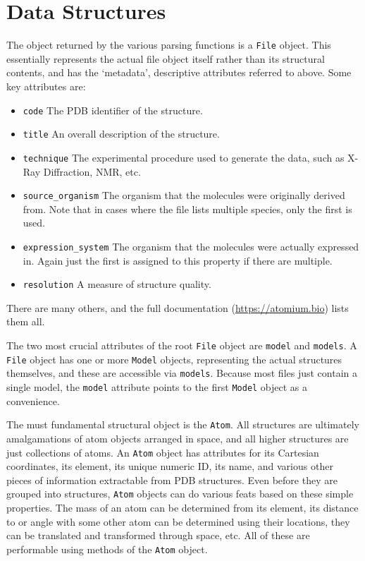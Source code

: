 \section{Data Structures}

The object returned by the various parsing functions is a \texttt{File} object. This essentially represents the actual file object itself rather than its structural contents, and has the `metadata', descriptive attributes referred to above. Some key attributes are:

\begin{itemize}
  \item \texttt{code} The PDB identifier of the structure.
  \item \texttt{title} An overall description of the structure.
  \item \texttt{technique} The experimental procedure used to generate the data, such as X-Ray Diffraction, NMR, etc.
  \item \texttt{source\_organism} The organism that the molecules were originally derived from. Note that in cases where the file lists multiple species, only the first is used.
  \item \texttt{expression\_system} The organism that the molecules were actually expressed in. Again just the first is assigned to this property if there are multiple.
  \item \texttt{resolution} A measure of structure quality.
\end{itemize}

There are many others, and the full documentation (\url{https://atomium.bio}) lists them all.

The two most crucial attributes of the root \texttt{File} object are \texttt{model} and \texttt{models}. A \texttt{File} object has one or more \texttt{Model} objects, representing the actual structures themselves, and these are accessible via \texttt{models}. Because most files just contain a single model, the \texttt{model} attribute points to the first \texttt{Model} object as a convenience.

The must fundamental structural object is the \texttt{Atom}. All structures are ultimately amalgamations of atom objects arranged in space, and all higher structures are just collections of atoms. An \texttt{Atom} object has attributes for its Cartesian coordinates, its element, its unique numeric ID, its name, and various other pieces of information extractable from PDB structures. Even before they are grouped into structures, \texttt{Atom} objects can do various feats based on these simple properties. The mass of an atom can be determined from its element, its distance to or angle with some other atom can be determined using their locations, they can be translated and transformed through space, etc. All of these are performable using methods of the \texttt{Atom} object.

